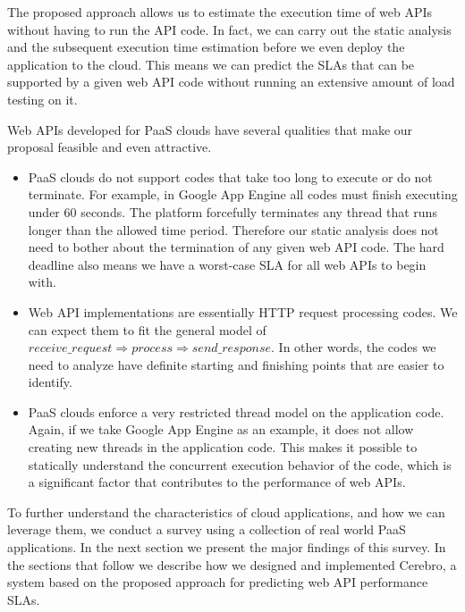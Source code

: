 The proposed approach allows us to estimate the execution time of web APIs without having to
run the API code.
In fact, we can carry out the static analysis and the subsequent execution time
estimation before we even deploy the application to the cloud. 
This means we can predict the SLAs that can be supported by a given web API code
without running an extensive amount of load testing on it. 

Web APIs developed for PaaS clouds have several qualities that make our proposal
feasible and even attractive.

\begin{itemize}
\item PaaS clouds do not support codes that take too long to execute or do not terminate. For 
example, in Google App Engine all codes must finish executing under 60 seconds.
The platform forcefully terminates any thread that runs longer than the allowed time period.
Therefore our static analysis does not need to bother about the termination of any given web API
code. The hard deadline also means we have a worst-case SLA for all web APIs to begin with.
\item Web API implementations are essentially HTTP request processing codes. We can expect them
to fit the general model of $receive\_request \Rightarrow process \Rightarrow send\_response$. In
other words, the codes we need to analyze have definite starting and finishing points that are easier
to identify.
\item PaaS clouds enforce a very restricted thread model on the application code. Again, if we take
Google App Engine as an example, it does not allow creating new threads in the application code. This
makes it possible to statically understand the concurrent execution behavior of the code, which is a significant
factor that contributes to the performance of web APIs.
\end{itemize}

To further understand the characteristics of cloud applications, and how we can leverage them,
we conduct a survey
using a collection of real world PaaS applications. In the next section we present the major findings
of this survey.
In the sections that follow we describe how we designed and implemented Cerebro, a system based on
the proposed approach for predicting web API performance SLAs.